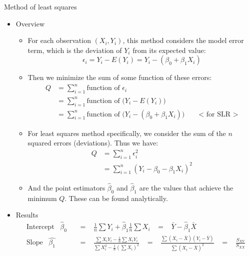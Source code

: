 \documentclass{article}
\begin{document}
Method of least squares\bigskip
\begin{itemize}
    \item Overview
    \begin{itemize}
        \item For each observation $(X_i, Y_i)$, this method considers the model error term, which is the deviation of $Y_i$ from its expected value:
        \[
        \epsilon_i = Y_i - E(Y_i) = Y_i - (\beta_0 + \beta_1 X_i)
        \]
        \item Then we minimize the sum of some function of these errors:
        \begin{align*}
          Q &= \sum_{i = 1}^n \text{function of } \epsilon_i \\
            &= \sum_{i = 1}^n \text{function of } \big(Y_i - E(Y_i)\big) \\
            &= \sum_{i = 1}^n \text{function of } \big(Y_i - (\beta_0 + \beta_1 X_i)\big) \quad\quad \text{< for SLR >}
        \end{align*}
        \item For least squares method specifically, we consider the sum of the $n$ squared errors (deviations). Thus we have:
        \begin{align*}
          Q &= \sum_{i = 1}^n \epsilon_i^2 \\
            &= \sum_{i = 1}^n (Y_i - \beta_0 - \beta_1 X_i)^2
        \end{align*}
        \item And the point estimators $\hat{\beta}_0$ and $\hat{\beta}_1$ are the values that achieve the minimum $Q$. These can be found analytically.
    \end{itemize}\bigskip
    \item Results
    \begin{align*}
      \text{Intercept} \hspace{10pt} \hat{\beta}_0 \hspace{10pt} &= \hspace{10pt} \frac{1}{n}\sum Y_i + \hat{\beta}_1 \frac{1}{n} \sum X_i \hspace{10pt} = \hspace{10pt} \bar{Y}- \hat{\beta}_1 \bar{X} \\
      \text{Slope} \hspace{10pt} \hat{\beta_1} \hspace{10pt} &= \hspace{10pt} \frac{\sum X_i Y_i -\frac{1}{n} \sum X_i Y_i}{\sum X_i^2 - \frac{1}{n}(\sum X_i)^2} \hspace{10pt} = \hspace{10pt} \frac{\sum(X_i - \bar{X})(Y_i - \bar{Y})}{\sum(X_i - \bar{X})^2} \hspace{10pt} = \hspace{10pt} \frac{S_{XY}}{S_{XX}}

\end{align*}
\end{itemize}
\end{document}
